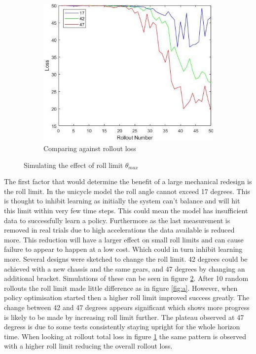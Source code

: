 \documentclass[twoside,twocolumn,12pt]{article}
\begin{document}
\begin{figure}[ht!]
\begin{subfigure}[t]{0.325\textwidth}
  \end{subfigure}
  \begin{subfigure}[t]{0.325\textwidth}
    \includegraphics[width=\linewidth]{lossav}
    \caption{Comparing against rollout loss}
  \label{fig:rl}
  \end{subfigure}
  \caption{Simulating the effect of roll limit $\theta_{max}$ }
  \label{fig:rolllimit}
\end{figure}
The first factor that would determine the benefit of a large mechanical redesign is the roll limit. In the unicycle model the roll angle cannot exceed 17 degrees. This is thought to inhibit learning as initially the system can't balance and will hit this limit within very few time steps. This could mean the model has insufficient data to successfully learn a policy. Furthermore as the last measurement is removed in real trials due to high accelerations the data available is reduced more. This reduction will have a larger effect on small roll limits and can cause failure to appear to happen at a low cost. Which could in turn inhibit learning more.
\newline
Several designs were sketched to change the roll limit. 42 degrees could be achieved with a new chassis and the same gears, and 47 degrees by changing an additional bracket. Simulations of these can be seen in figure \ref{fig:rolllimit}.
\newline
After 10 random rollouts the roll limit made little difference as in figure \ref{fig:a}. However, when policy optimisation started then a higher roll limit improved success greatly. The change between 42 and 47 degrees appears significant which shows more progress is likely to be made by increasing roll limit further. The plateau observed at 47 degress is due to some tests consistently staying upright for the whole horizon time. When looking at rollout total loss in figure \ref{fig:rl} the same pattern is observed with a higher roll limit reducing the overall rollout loss.
\end{document}

